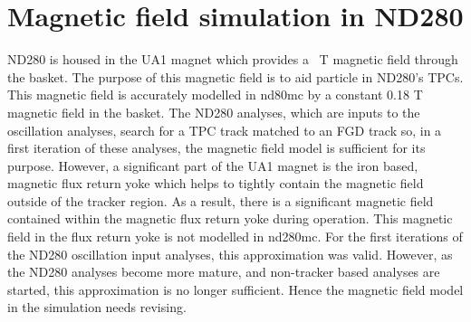 \chapter{Magnetic field simulation in ND280}
\label{chap:MagneticFieldSimulation}
ND280 is housed in the  UA1 magnet which provides a ~T magnetic field through the basket.  The purpose of this magnetic field is to aid particle   in ND280's TPCs.  This magnetic field is accurately modelled in nd80mc by a constant 0.18 T magnetic field in the basket.  The ND280 analyses, which are inputs to the oscillation analyses, search for a TPC track matched to an FGD track so, in a first iteration of these analyses, the magnetic field model is sufficient for its purpose.
\newline
\newline
However, a significant part of the UA1 magnet is the iron based, magnetic flux return yoke which helps to tightly contain the magnetic field outside of the tracker region.  As a result, there is a significant magnetic field contained within the magnetic flux return yoke during operation.  This magnetic field in the flux return yoke is not modelled in nd280mc.  For the first iterations of the ND280 oscillation input analyses, this approximation was valid.  However, as the ND280 analyses become more mature, and non-tracker based analyses are started, this approximation is no longer sufficient.  Hence the magnetic field model in the simulation needs revising.
\newline
\newline
{}

